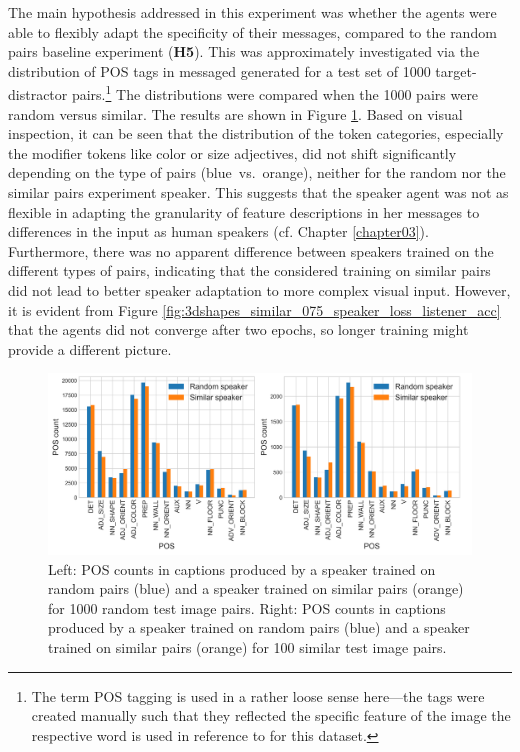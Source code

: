 The main hypothesis addressed in this experiment was whether the agents were able to flexibly adapt the specificity of their messages, compared to the random pairs baseline experiment (\textbf{H5}). This was approximately investigated via the distribution of POS tags in messaged generated for a test set of 1000 target-distractor pairs.\footnote{The term POS tagging is used in a rather loose sense here---the tags were created manually such that they reflected the specific feature of the image the respective word is used in reference to for this dataset.} The distributions were compared when the 1000 pairs were random versus similar. The results are shown in Figure \ref{fig:3dshapes_pos}. Based on visual inspection, it can be seen that the distribution of the token categories, especially the modifier tokens like color or size adjectives, did not shift significantly depending on the type of pairs (blue~vs.~orange), neither for the random nor the similar pairs experiment speaker. This suggests that the speaker agent was not as flexible in adapting the granularity of feature descriptions in her messages to differences in the input as human speakers (cf. Chapter \ref{chapter03}). Furthermore, there was no apparent difference between speakers trained on the different types of pairs, indicating that the considered training on similar pairs did not lead to better speaker adaptation to more complex visual input. However, it is evident from Figure \ref{fig:3dshapes_similar_075_speaker_loss_listener_acc} that the agents did not converge after two epochs, so longer training might provide a different picture.

\begin{figure}[h]
	\centering
	\includegraphics[width=\linewidth]{images/3dshapes_random_vs_similar_POS_counts.png}
	\caption{Left: POS counts in captions produced by a speaker trained on random pairs (blue) and a speaker trained on similar pairs (orange) for 1000 random test image pairs. Right: POS counts in captions produced by a speaker trained on random pairs (blue) and a speaker trained on similar pairs (orange) for 100 similar test image pairs. }
	\label{fig:3dshapes_pos}
\end{figure}

